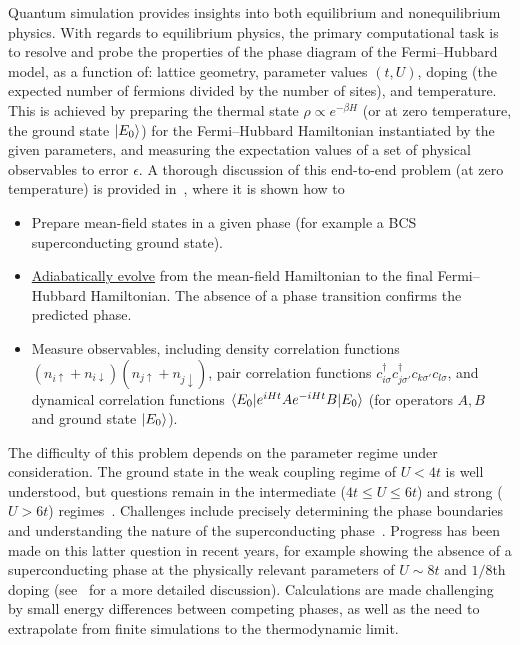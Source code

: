 \begin{refsection}
Quantum simulation provides insights into both equilibrium and nonequilibrium physics. With regards to equilibrium physics, the primary computational task is to resolve and probe the properties of the phase diagram of the Fermi--Hubbard model, as a function of: lattice geometry, parameter values $(t, U)$, doping (the expected number of fermions divided by the number of sites), and temperature. This is achieved by preparing the thermal state $\rho \propto e^{-\beta H}$ (or at zero temperature, the ground state $\lvert E_0\rangle$) for the Fermi--Hubbard Hamiltonian instantiated by the given parameters, and measuring the expectation values of a set of physical observables to error $\epsilon$. A thorough discussion of this end-to-end problem (at zero temperature) is provided in~\cite{wecker2015StronglyCorrelated}, where it is shown how to
\begin{itemize}
    \item Prepare mean-field states in a given phase (for example a BCS superconducting ground state).
    \item \hyperref[prim:QuantumAdiabaticAlgorithm]{Adiabatically evolve} from the mean-field Hamiltonian to the final Fermi--Hubbard Hamiltonian. The absence of a phase transition confirms the predicted phase.
    \item Measure observables, including density correlation functions $(n_{i \uparrow} + n_{i \downarrow})(n_{j \uparrow} + n_{j \downarrow}) $, pair correlation functions $c_{i \sigma}^\dag c_{j \sigma'}^\dag c_{k \sigma'} c_{l \sigma}$, and dynamical correlation functions $\langle E_0\rvert e^{iHt} A e^{-iHt}B \lvert E_0\rangle$ (for operators $A,B$ and ground state $\lvert E_0\rangle$).
\end{itemize}
The difficulty of this problem depends on the parameter regime under consideration. The ground state in the weak coupling regime of $U < 4t$ is well understood, but questions remain in the intermediate ($4t \leq U \leq 6t$) and strong ($U > 6t$) regimes~\cite{Qin2022HubbardComputational}. Challenges include precisely determining the phase boundaries and understanding the nature of the superconducting phase~\cite{fradkin2015ColloquiumHighTcSC}. Progress has been made on this latter question in recent years, for example showing the absence of a superconducting phase at the physically relevant parameters of $U \sim 8t$ and $1/8$th doping (see~\cite{Qin2022HubbardComputational} for a more detailed discussion). Calculations are made challenging by small energy differences between competing phases, as well as the need to extrapolate from finite simulations to the thermodynamic limit.




\end{refsection}

